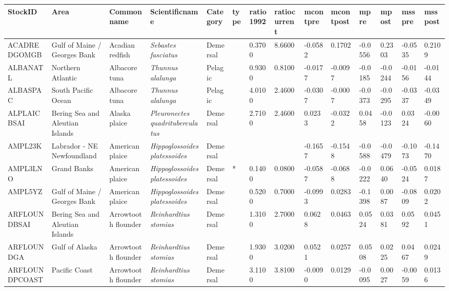 \begin{longtable}{p{2.8cm}p{2cm}p{1.7cm}p{1.7cm}p{1cm}p{0.3cm}p{1cm}p{1cm}p{1cm}p{1cm}p{1cm}p{1cm}p{1cm}p{1cm}}
  \hline
StockID & Area & Commonname & Scientificname & Category & type & ratio1992 & ratiocurrent & mcontpre & mcontpost & mpre & mpost & msspre & msspost \\ 
  \hline
ACADREDGOMGB & Gulf of Maine / Georges Bank & Acadian redfish & \textit{Sebastes fasciatus} & Demersal &   & 0.3700 & 8.6600 & -0.0582 & 0.1702 & -0.0556 & 0.2303 & -0.0535 & 0.2109 \\ 
  ALBANATL & Northern Atlantic & Albacore tuna & \textit{Thunnus alalunga} & Pelagic &   & 0.9300 & 0.8100 & -0.0177 & -0.0097 & -0.0185 & -0.0244 & -0.0156 & -0.0144 \\ 
  ALBASPAC & South Pacific Ocean & Albacore tuna & \textit{Thunnus alalunga} & Pelagic &   & 4.0100 & 2.4600 & -0.0307 & -0.0007 & -0.0373 & -0.0295 & -0.0337 & -0.0349 \\ 
  ALPLAICBSAI & Bering Sea and Aleutian Islands & Alaska plaice & \textit{Pleuronectes quadrituberculatus} & Demersal &   & 2.7100 & 2.4600 & 0.0233 & -0.0322 & 0.0458 & -0.0123 & 0.0324 & -0.0060 \\ 
  AMPL23K & Labrador - NE Newfoundland & American plaice & \textit{Hippoglossoides platessoides} & Demersal &  &  &  & -0.1657 & -0.1548 & -0.0588 & -0.0479 & -0.1073 & -0.1470 \\ 
  AMPL3LNO & Grand Banks & American plaice & \textit{Hippoglossoides platessoides} & Demersal & * & 0.1400 & 0.0800 & -0.0587 & -0.0688 & -0.0222 & 0.0640 & -0.0524 & 0.0187 \\ 
  AMPL5YZ & Gulf of Maine / Georges Bank & American plaice & \textit{Hippoglossoides platessoides} & Demersal &   & 0.5200 & 0.7000 & -0.0993 & 0.0283 & -0.1398 & 0.0087 & -0.0809 & 0.0202 \\ 
  ARFLOUNDBSAI & Bering Sea and Aleutian Islands & Arrowtooth flounder & \textit{Reinhardtius stomias} & Demersal &   & 1.3100 & 2.7000 & 0.0628 & 0.0463 & 0.0524 & 0.0381 & 0.0592 & 0.0451 \\ 
  ARFLOUNDGA & Gulf of Alaska & Arrowtooth flounder & \textit{Reinhardtius stomias} & Demersal &   & 1.9300 & 3.0200 & 0.0521 & 0.0257 & 0.0508 & 0.0225 & 0.0467 & 0.0249 \\ 
  ARFLOUNDPCOAST & Pacific Coast & Arrowtooth flounder & \textit{Reinhardtius stomias} & Demersal &   & 3.1100 & 3.8100 & -0.0090 & 0.0129 & -0.0095 & 0.0027 & -0.0059 & 0.0136 \\ 

\end{longtable}

